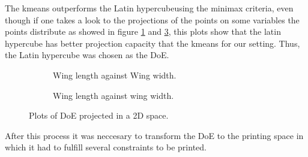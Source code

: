 The kmeans outperforms the Latin hypercubeusing the minimax criteria, even though if one takes a look to the projections of the points on some variables the points distribute as showed in figure \ref{fig_wl_vs_ww_lhd} and \ref{fig_wl_vs_ww_kmeans}, this plots show that the latin hypercube has better projection capacity that the kmeans for our setting. Thus, the Latin hypercube was chosen as the DoE.

\begin{figure}
	\begin{subfigure}[h]{.5\linewidth}
		
		\caption{Wing length against Wing width.}
		\label{fig_wl_vs_ww_lhd}
	\end{subfigure}
	\begin{subfigure}[h]{.5\linewidth}
		
		\caption{Wing length against wing width.}
		\label{fig_wl_vs_ww_kmeans}
	\end{subfigure}
	\caption{Plots of DoE projected in a 2D space.}
\end{figure}

After this process it was neccesary to transform the DoE to the printing space in which it had to fulfill several constraints to be printed.